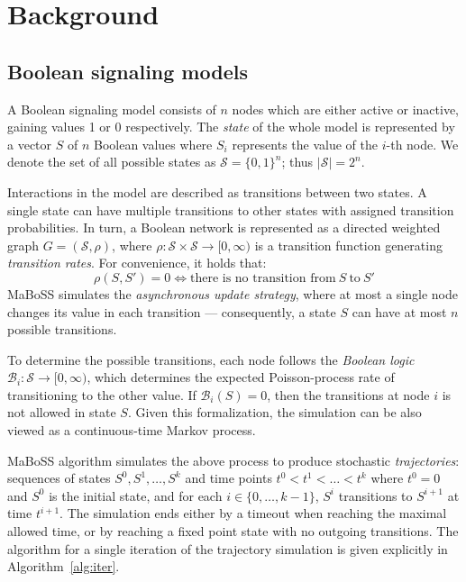 \documentclass[a4paper,num-refs]{oup-contemporary}
\begin{document}
\section{Background}

\subsection{Boolean signaling models}


A Boolean signaling model consists of $n$ nodes which are either active or inactive, gaining values 1 or 0 respectively. The \emph{state} of the whole model is represented by a vector $S$ of $n$ Boolean values where $S_i$ represents the value of the $i$-th node. We denote the set of all possible states as $\mathcal{S} = \{0, 1\}^n$; thus $|\mathcal{S}| = 2^n$. 

Interactions in the model are described as transitions between two states. A single state can have multiple transitions to other states with assigned transition probabilities. In turn, a Boolean network is represented as a directed weighted graph $G = (\mathcal{S}, \rho)$, where $\rho: \mathcal{S} \times \mathcal{S} \rightarrow [0, \infty)$ is a transition function generating \emph{transition rates}. For convenience, it holds that:
\[ \rho(S, S') = 0 \iff \text{there is no transition from}\ S\ \text{to}\ S' \]
MaBoSS simulates the \emph{asynchronous update strategy}, where at most a single node changes its value in each transition --- consequently, a state $S$ can have at most $n$ possible transitions.

To determine the possible transitions, each node follows the \emph{Boolean logic} $\mathcal{B}_i: \mathcal{S} \rightarrow [0, \infty)$, which determines the expected Poisson-process rate of transitioning to the other value. If $\mathcal{B}_i(S) = 0$, then the transitions at node $i$ is not allowed in state $S$.
Given this formalization, the simulation can be also viewed as a continuous-time Markov process.

MaBoSS algorithm simulates the above process to produce stochastic \emph{trajectories}: sequences of states $S^0, S^1, \dots, S^k$ and time points $t^0 < t^1 < \dots < t^k$ where $t^0 = 0$ and $S^0$ is the initial state, and for each $i \in \{0, \dots, k-1\}$, $S^i$ transitions to $S^{i+1}$ at time $t^{i+1}$. The simulation ends either by a timeout when reaching the maximal allowed time, or by reaching a fixed point state with no outgoing transitions. The algorithm for a single iteration of the trajectory simulation is given explicitly in Algorithm~\ref{alg:iter}.
\end{document}
